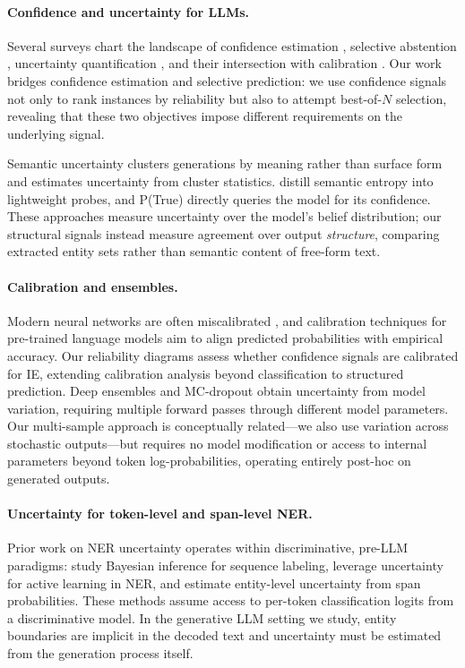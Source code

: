 \paragraph{Confidence and uncertainty for LLMs.}
Several surveys chart the landscape of confidence estimation \cite{geng2024confidence}, selective abstention \cite{wen2025know}, uncertainty quantification \cite{xia2025survey}, and their intersection with calibration \cite{hobelsberger2025systematic}.
Our work bridges confidence estimation and selective prediction: we use confidence signals not only to rank instances by reliability but also to attempt best-of-$N$ selection, revealing that these two objectives impose different requirements on the underlying signal.

Semantic uncertainty \cite{kuhn2023semantic} clusters generations by meaning rather than surface form and estimates uncertainty from cluster statistics.
\citet{kossen2024semantic} distill semantic entropy into lightweight probes, and P(True) \cite{kadavath2022language} directly queries the model for its confidence.
These approaches measure uncertainty over the model's belief distribution; our structural signals instead measure agreement over output \textit{structure}, comparing extracted entity sets rather than semantic content of free-form text.

\paragraph{Calibration and ensembles.}
Modern neural networks are often miscalibrated \cite{guo2017calibration}, and calibration techniques for pre-trained language models \cite{desai2020calibration} aim to align predicted probabilities with empirical accuracy.
Our reliability diagrams assess whether confidence signals are calibrated for IE, extending calibration analysis beyond classification to structured prediction.
Deep ensembles \cite{lakshminarayanan2017ensembles} and MC-dropout \cite{gal2016dropout} obtain uncertainty from model variation, requiring multiple forward passes through different model parameters.
Our multi-sample approach is conceptually related---we also use variation across stochastic outputs---but requires no model modification or access to internal parameters beyond token log-probabilities, operating entirely post-hoc on generated outputs.

\paragraph{Uncertainty for token-level and span-level NER.}
Prior work on NER uncertainty operates within discriminative, pre-LLM paradigms: \citet{xiao2019uncertainty} study Bayesian inference for sequence labeling, \citet{shelmanov2021active} leverage uncertainty for active learning in NER, and \citet{zhang2023ener} estimate entity-level uncertainty from span probabilities.
These methods assume access to per-token classification logits from a discriminative model.
In the generative LLM setting we study, entity boundaries are implicit in the decoded text and uncertainty must be estimated from the generation process itself.

